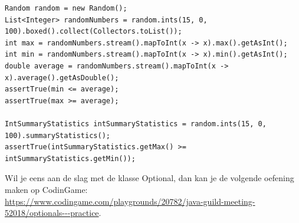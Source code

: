 \begin{lstlisting}
Random random = new Random();
List<Integer> randomNumbers = random.ints(15, 0, 100).boxed().collect(Collectors.toList());
int max = randomNumbers.stream().mapToInt(x -> x).max().getAsInt();
int min = randomNumbers.stream().mapToInt(x -> x).min().getAsInt();
double average = randomNumbers.stream().mapToInt(x -> x).average().getAsDouble();
assertTrue(min <= average);
assertTrue(max >= average);

IntSummaryStatistics intSummaryStatistics = random.ints(15, 0, 100).summaryStatistics();
assertTrue(intSummaryStatistics.getMax() >= intSummaryStatistics.getMin());
\end{lstlisting}


\begin{oefening}
Wil je eens aan de slag met de klasse Optional, dan kan je de volgende oefening maken op CodinGame:\\
\url{https://www.codingame.com/playgrounds/20782/java-guild-meeting-52018/optionals---practice}.
\end{oefening}